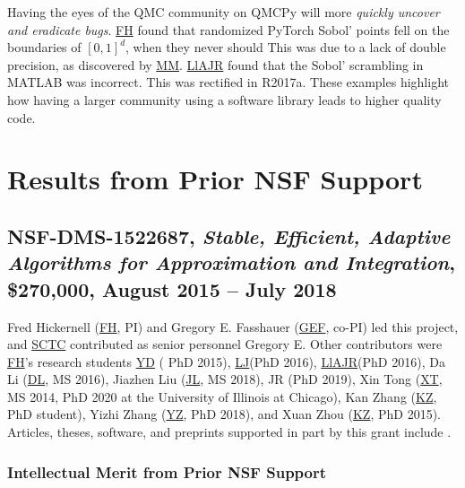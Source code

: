 \documentclass[11pt]{NSFamsart}
\newcommand{\FH}{\hyperlink{FHlink}{FH}\xspace}
\newcommand{\SCTC}{\hyperlink{SCTClink}{SCTC}\xspace}
\newcommand{\MM}{\hyperlink{MMlink}{MM}\xspace}
\newcommand{\GEF}{\hyperlink{GEFlink}{GEF}\xspace}
\newcommand{\YD}{\hyperlink{YDlink}{YD}\xspace}
\newcommand{\LlAJR}{\hyperlink{LlAJRlink}{LlAJR}\xspace}
\newcommand{\LJ}{\hyperlink{LJlink}{LJ}\xspace}
\newcommand{\XT}{\hyperlink{XTlink}{XT}\xspace}
\newcommand{\KZ}{\hyperlink{KZlink}{KZ}\xspace}
\newcommand{\DL}{\hyperlink{DLlink}{DL}\xspace}
\newcommand{\XZ}{\hyperlink{XZlink}{KZ}\xspace}
\newcommand{\JL}{\hyperlink{JLlink}{JL}\xspace}
\newcommand{\YZ}{\hyperlink{YZlink}{YZ}\xspace}
\newcommand{\MATLAB}{MATLAB\xspace}
\newcommand{\PyTorch}{PyTorch\xspace}
\begin{document}
Having the eyes of the QMC community on QMCPy will more \emph{quickly uncover and eradicate bugs}.  \FH found  that randomized \PyTorch Sobol' points fell on the boundaries of $[0,1]^d$, when they never should \cite{PyTorchFirstPt2020a} This was due to a lack of double precision, as discovered by \MM.  \LlAJR found that the Sobol' scrambling in \MATLAB was incorrect.  This was rectified in R2017a.  These examples highlight how having a larger community using a software library leads to higher quality code.


\section{Results from Prior NSF Support} \label{sec:prior_work}

\subsection{NSF-DMS-1522687, \emph{Stable, Efficient, Adaptive Algorithms for
		Approximation and Integration},
	\$270,000, August 2015 -- July 2018} \label{sec:PreviousFred}
Fred Hickernell (\FH, PI) and Gregory E. Fasshauer (\GEF, co-PI) led this project, and \SCTC contributed as senior personnel
Gregory E.  Other contributors were \FH's research students {\YD} ( PhD 2015), \LJ (PhD 2016),
\LlAJR (PhD 2016), \hypertarget{DLlink}{Da Li} (\DL, MS 2016), \hypertarget{JLlink}{Jiazhen Liu} (\JL, MS 2018), JR (PhD 2019), \hypertarget{XTlink}{Xin Tong} (\XT, MS 2014, PhD 2020 at the University of Illinois at Chicago), \hypertarget{KZlink}{Kan Zhang} (\KZ, PhD student), \hypertarget{YZlink}{Yizhi Zhang} (\YZ, PhD 2018), and \hypertarget{XZlink}{Xuan Zhou} (\XZ, PhD 2015).  Articles, theses,
software, and preprints supported in
part by this
grant
include
\cite{ala_augmented_2017,
	ChoEtal17a,
	ChoEtal21a,
	Din15a,
	DinHic20a,
	GilEtal16a,
	Hic17a,
	HicJag18b,
	HicJim16a,
	HicEtal18a,
	HicEtal17a,
	HicKriWoz19a,
	RatHic19a,
	GilJim16b,
	JimHic16a,
	JohFasHic18a,
	Li16a,
	Liu17a,
	MarEtal18a,
	mccourt_stable_2017,
	MCCEtal19a,
	mishra_hybrid_2018,
	MisEtal19a,
	rashidinia_stable_2016,
	rashidinia_stable_2018,
	Zha18a,
	Zha17a,
	Zho15a,
	ZhoHic15a}.

\subsubsection{Intellectual Merit from Prior NSF Support}
\label{previousmeritsubsec}
\end{document}
